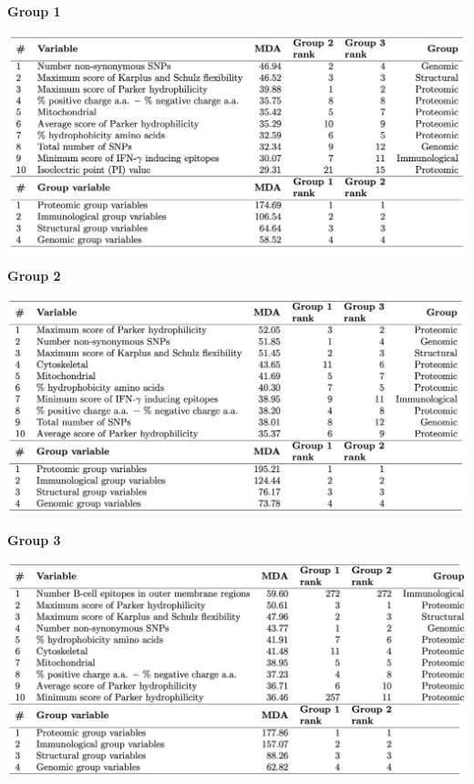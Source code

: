 \documentclass[
  11pt,
  oneside]{book}
\begin{document}
\textbf{Group 1}

\begin{center}\includegraphics[width=1\linewidth]{./figures/Table 1} \end{center}

\textbf{Group 2}

\begin{center}\includegraphics[width=1\linewidth]{./figures/Table 2} \end{center}

\textbf{Group 3}

\begin{center}\includegraphics[width=1\linewidth]{./figures/Table 3} \end{center}
\end{document}
